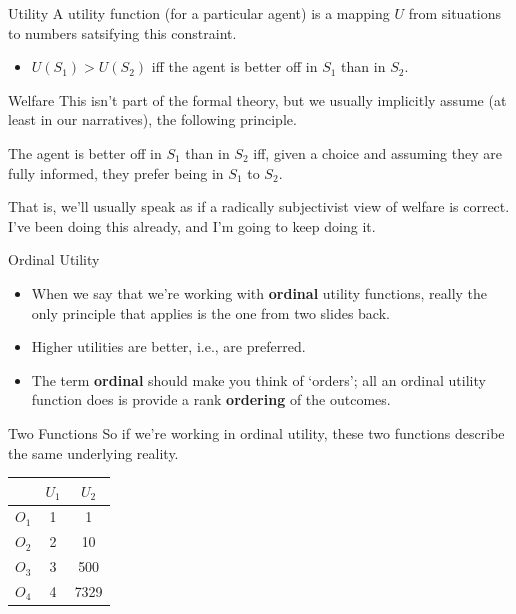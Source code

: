 \documentclass[
  14pt,
  letterpaper,
  ignorenonframetext,
  aspectratio=169,
  handout]{beamer}
\providecommand{\tightlist}{%
  \setlength{\itemsep}{0pt}\setlength{\parskip}{0pt}}\usepackage{longtable,booktabs,array}
\renewenvironment*{quote}	
	{\list{}{\rightmargin   \leftmargin} \item } 	
	{\endlist }
\let\olditem\item
\renewcommand{\item}{%
\olditem\vspace{6pt}}
\begin{document}
\begin{frame}{Utility}
\protect\hypertarget{utility-2}{}
A utility function (for a particular agent) is a mapping \(U\) from
situations to numbers satsifying this constraint.

\begin{itemize}[<+->]
\tightlist
\item
  \(U(S_1) > U(S_2)\) iff the agent is better off in \(S_1\) than in
  \(S_2\).
\end{itemize}
\end{frame}

\begin{frame}{Welfare}
\protect\hypertarget{welfare}{}
This isn't part of the formal theory, but we usually implicitly assume
(at least in our narratives), the following principle.

\begin{quote}
The agent is better off in \(S_1\) than in \(S_2\) iff, given a choice
and assuming they are fully informed, they prefer being in \(S_1\) to
\(S_2\).
\end{quote}

That is, we'll usually speak as if a radically subjectivist view of
welfare is correct. I've been doing this already, and I'm going to keep
doing it.
\end{frame}

\begin{frame}{Ordinal Utility}
\protect\hypertarget{ordinal-utility}{}
\begin{itemize}[<+->]
\tightlist
\item
  When we say that we're working with \textbf{ordinal} utility
  functions, really the only principle that applies is the one from two
  slides back.
\item
  Higher utilities are better, i.e., are preferred.
\item
  The term \textbf{ordinal} should make you think of `orders'; all an
  ordinal utility function does is provide a rank \textbf{ordering} of
  the outcomes.
\end{itemize}
\end{frame}

\begin{frame}{Two Functions}
\protect\hypertarget{two-functions}{}
So if we're working in ordinal utility, these two functions describe the
same underlying reality.

\begin{longtable}[]{@{}lcc@{}}
\toprule()
& \(U_1\) & \(U_2\) \\
\midrule()
\endhead
\(O_1\) & 1 & 1 \\
\(O_2\) & 2 & 10 \\
\(O_3\) & 3 & 500 \\
\(O_4\) & 4 & 7329 \\
\bottomrule()
\end{longtable}
\end{frame}
\end{document}
